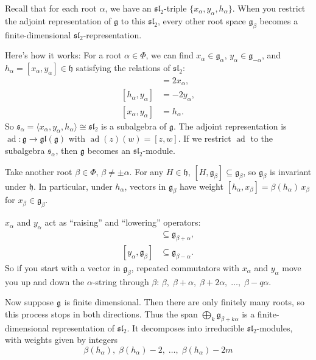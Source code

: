 \documentclass[12pt]{article}
\begin{document}
\begin{remark}
    Recall that for each root $\alpha$, we have an $\mathfrak{sl}_2$-triple $\{x_\alpha, y_\alpha, h_\alpha\}$. When you restrict the adjoint representation of $\mathfrak{g}$ to this $\mathfrak{sl}_2$, every other root space $\mathfrak{g}_\beta$ becomes a finite-dimensional $\mathfrak{sl}_2$-representation.

    Here's how it works: For a root $\alpha \in \Phi$, we can find $x_\alpha \in \mathfrak{g}_\alpha$, $y_\alpha \in \mathfrak{g}_{-\alpha}$, and $h_\alpha = [x_\alpha, y_\alpha] \in \mathfrak{h}$ satisfying the relations of $\mathfrak{sl}_2$:
    \begin{align*}
        [h_\alpha, x_\alpha] & = 2x_\alpha,  \\
        [h_\alpha, y_\alpha] & = -2y_\alpha, \\
        [x_\alpha, y_\alpha] & = h_\alpha.
    \end{align*}
    So $\mathfrak{s}_\alpha = \langle x_\alpha, y_\alpha, h_\alpha\rangle \cong \mathfrak{sl}_2$ is a subalgebra of $\mathfrak{g}$. The adjoint representation is $\operatorname{ad}: \mathfrak{g} \to \mathfrak{gl}(\mathfrak{g})$ with $\operatorname{ad}(z)(w) = [z, w]$. If we restrict $\operatorname{ad}$ to the subalgebra $\mathfrak{s}_\alpha$, then $\mathfrak{g}$ becomes an $\mathfrak{sl}_2$-module.

    Take another root $\beta \in \Phi$, $\beta \neq \pm\alpha$. For any $H \in \mathfrak{h}$, $[H, \mathfrak{g}_\beta] \subseteq \mathfrak{g}_\beta$, so $\mathfrak{g}_\beta$ is invariant under $\mathfrak{h}$. In particular, under $h_\alpha$, vectors in $\mathfrak{g}_\beta$ have weight $[h_\alpha, x_\beta] = \beta(h_\alpha)\,x_\beta$ for $x_\beta \in \mathfrak{g}_\beta$.

    $x_\alpha$ and $y_\alpha$ act as “raising” and “lowering” operators:
    \begin{align*}
        [x_\alpha, \mathfrak{g}_\beta] & \subseteq \mathfrak{g}_{\beta+\alpha}, \\
        [y_\alpha, \mathfrak{g}_\beta] & \subseteq \mathfrak{g}_{\beta-\alpha}.
    \end{align*}
    So if you start with a vector in $\mathfrak{g}_\beta$, repeated commutators with $x_\alpha$ and $y_\alpha$ move you up and down the $\alpha$-string through $\beta$: $\beta, \;\beta+\alpha, \;\beta+2\alpha, \;\dots,\;\beta-q\alpha$.

    Now suppose $\mathfrak{g}$ is finite dimensional. Then there are only finitely many roots, so this process stops in both directions. Thus the span $\bigoplus_{k} \mathfrak{g}_{\beta+k\alpha}$ is a finite-dimensional representation of $\mathfrak{sl}_2$. It decomposes into irreducible $\mathfrak{sl}_2$-modules, with weights given by integers \[\beta(h_\alpha),\;\beta(h_\alpha)-2,\;\dots,\;\beta(h_\alpha)-2m\]


\end{remark}
\end{document}
